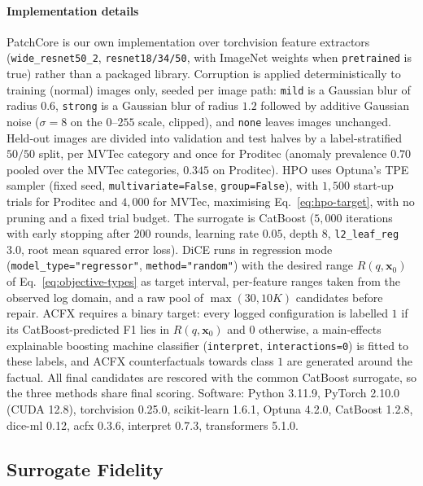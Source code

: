 \documentclass[final,5p,times,twocolumn]{elsarticle}
\begin{document}
\paragraph{Implementation details}
PatchCore is our own implementation over torchvision feature
extractors (\texttt{wide\_resnet50\_2}, \texttt{resnet18/34/50}, with
ImageNet weights when \texttt{pretrained} is true) rather than a
packaged library. Corruption is applied deterministically to training
(normal) images only, seeded per image path: \texttt{mild} is a Gaussian blur of radius $0.6$, \texttt{strong} is a Gaussian blur of radius $1.2$ followed by additive Gaussian noise ($\sigma = 8$ on the $0$--$255$ scale, clipped), and \texttt{none} leaves images unchanged.
Held-out images are divided into validation and test halves by a label-stratified $50/50$ split, per MVTec category and once for Proditec (anomaly prevalence $0.70$ pooled over the MVTec categories, $0.345$ on Proditec). HPO uses
Optuna's TPE sampler (fixed seed, \texttt{multivariate=False},
\texttt{group=False}), with $1{,}500$ start-up trials for Proditec and
$4{,}000$ for MVTec, maximising
Eq.~\ref{eq:hpo-target}, with no pruning and a fixed trial budget. The
surrogate is CatBoost ($5{,}000$ iterations with early stopping after
$200$ rounds, learning rate $0.05$, depth $8$, \texttt{l2\_leaf\_reg}
$3.0$, root mean squared error loss). DiCE runs in regression mode (\texttt{model\_type="regressor"},
\texttt{method="random"}) with the desired range $R(q,\mathbf{x}_0)$ of
Eq.~\ref{eq:objective-types} as target interval, per-feature ranges
taken from the observed log domain, and a raw pool of $\max(30, 10K)$
candidates before repair. ACFX requires a binary target: every logged
configuration is labelled $1$ if its CatBoost-predicted F1 lies in
$R(q,\mathbf{x}_0)$ and $0$ otherwise, a main-effects explainable
boosting machine classifier (\texttt{interpret},
\texttt{interactions=0}) is fitted to these labels, and ACFX
counterfactuals towards class $1$ are generated around the factual. All
final candidates are rescored with the common CatBoost surrogate, so the
three methods share final scoring.
Software: Python 3.11.9,
PyTorch 2.10.0 (CUDA 12.8), torchvision 0.25.0, scikit-learn 1.6.1,
Optuna 4.2.0, CatBoost 1.2.8, dice-ml 0.12, acfx 0.3.6, interpret
0.7.3, transformers 5.1.0.

\subsection{Surrogate Fidelity}
\label{subsec:surrogate-fidelity}
\end{document}
